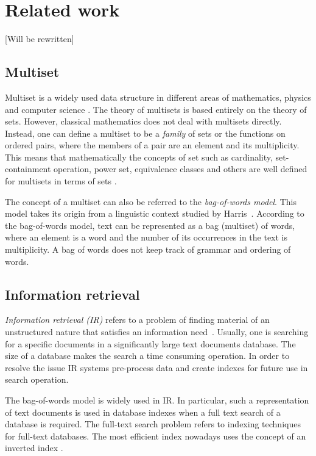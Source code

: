 \section{Related work} \label{c:relwork}
[Will be rewritten]

%
\subsection{Multiset}
Multiset is a widely used data structure in different areas of mathematics, physics 
and computer science \cite{singh2007overview}. The theory of multisets is based 
entirely on the theory of sets. However, classical mathematics does not deal with 
multisets directly. Instead, one can define a multiset to be a \emph{family} of sets 
or the functions on ordered pairs, where the members of a pair are an element and its 
multiplicity. This means that mathematically the concepts of set such as cardinality, 
set-containment operation, power set, equivalence classes and others are well defined 
for multisets in terms of sets \cite{blizard1988multiset}. 

The concept of a multiset can also be referred to the \emph{bag-of-words model}. 
This model takes its origin from a linguistic context studied by Harris~\cite{harris1954distributional}. 
According to the bag-of-words model, text can be represented as a bag (multiset) 
of words, where an element is a word and the number of its occurrences in the 
text is multiplicity. A bag of words does not keep track of grammar and ordering 
of words. 

\subsection{Information retrieval}
\emph{Information retrieval (IR)} refers to a problem of finding material of an 
unstructured nature that satisfies an information need~\cite{manning2008introduction}. 
Usually, one is searching for a specific documents in a significantly large text 
documents database. The size of a database makes the search a time consuming 
operation. In order to resolve the issue IR systems pre-process data and create 
indexes for future use in search operation. 

The bag-of-words model is widely used in IR. In particular, such a representation of 
text documents is used in database indexes when a full text search of a database 
is required. The full-text search problem refers to indexing techniques for full-text 
databases. The most efficient index nowadays uses the concept of an inverted index 
\cite{zobel1992efficient}. 

